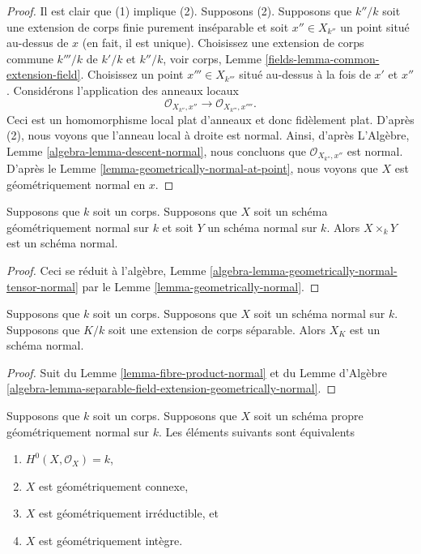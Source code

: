 \begin{proof}
Il est clair que (1) implique (2). Supposons (2). Supposons que
$k''/k$ soit une extension de corps finie purement inséparable et
soit $x'' \in X_{k''}$ un point situé au-dessus de $x$ (en fait, il
est unique). Choisissez une extension de corps commune $k'''/k$ de
$k'/k$ et $k''/k$, voir corps, Lemme
\ref{fields-lemma-common-extension-field}. Choisissez un point $x''' \in X_{k'''}$
situé au-dessus à la fois de $x'$ et $x''$. Considérons l'application des anneaux locaux
$$
\mathcal{O}_{X_{k''}, x''} \longrightarrow \mathcal{O}_{X_{k'''}, x''''}.
$$
Ceci est un homomorphisme local plat d'anneaux et donc
fidèlement plat. D'après (2), nous voyons que l'anneau local à
droite est normal. Ainsi, d'après L'Algèbre, Lemme
\ref{algebra-lemma-descent-normal}, nous concluons que
$\mathcal{O}_{X_{k''}, x''}$ est normal. D'après le Lemme
\ref{lemma-geometrically-normal-at-point}, nous voyons que $X$ est géométriquement normal en $x$.
\end{proof}

\begin{lemma}
\label{lemma-fibre-product-normal}
Supposons que $k$ soit un corps. Supposons que $X$ soit un
schéma géométriquement normal sur $k$ et soit $Y$ un schéma
normal sur $k$. Alors $X \times_k Y$ est un schéma normal.
\end{lemma}

\begin{proof}
Ceci se réduit à l'algèbre, Lemme
\ref{algebra-lemma-geometrically-normal-tensor-normal}
par le Lemme
\ref{lemma-geometrically-normal}.
\end{proof}

\begin{lemma}
\label{lemma-base-change-normal-by-separable}
Supposons que $k$ soit un corps. Supposons que $X$ soit un schéma normal sur $k$.
Supposons que $K/k$ soit une extension de corps séparable. Alors $X_K$ est un schéma normal.
\end{lemma}

\begin{proof}
Suit du Lemme
\ref{lemma-fibre-product-normal} et du Lemme d'Algèbre
\ref{algebra-lemma-separable-field-extension-geometrically-normal}.
\end{proof}

\begin{lemma}
\label{lemma-geometrically-normal-stein}
Supposons que $k$ soit un corps. Supposons que $X$ soit un schéma propre
géométriquement normal sur $k$. Les éléments suivants sont équivalents
\begin{enumerate}
\item $H^0(X, \mathcal{O}_X) = k$, \item
$X$ est géométriquement connexe, \item
$X$ est géométriquement irréductible, et
\item $X$ est géométriquement intègre.
\end{enumerate}
\end{lemma}

